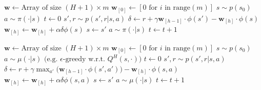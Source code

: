 \begin{appendices}


\begin{algorithm}[H]\small
\caption{\small Linear One-step FHTD for estimating $V^H \approx v^H_\pi$}
\label{alg:onestepfhtd}
\begin{algorithmic}
\State $\textbf{w} \leftarrow \textrm{Array of size } (H + 1) \times m$%
\State $\textbf{w}_{[0]} \leftarrow [0 \textrm{ for } i \textrm{ in } \textrm{range}(m)]$
\State $s \sim p(s_0)$
\State $a \sim \pi(\cdot|s)$
\State $t \leftarrow 0$
    \State $s', r \sim p(s', r|s, a)$
        \State $\delta \leftarrow r + \gamma \textbf{w}_{[h - 1]} \cdot \phi(s') - \textbf{w}_{[h]} \cdot \phi(s)$
        \State $\textbf{w}_{[h]} \leftarrow \textbf{w}_{[h]} + \alpha \delta \phi(s)$
    \EndFor
    \State $s \leftarrow s'$
    \State $a \sim \pi(\cdot|s)$
    \State $t \leftarrow t + 1$
\EndWhile
\end{algorithmic}
\end{algorithm}
\vspace{-\baselineskip}


\begin{algorithm}[H]\small
\caption{\small Linear One-step FHQ-Learning for estimating $Q^H \approx q^H_*$}
\label{alg:onestepfhqlearning}
\begin{algorithmic}
\State $\textbf{w} \leftarrow \textrm{Array of size } (H + 1) \times m$%
\State $\textbf{w}_{[0]} \leftarrow [0 \textrm{ for } i \textrm{ in } \textrm{range}(m)]$
\State $s \sim p(s_0)$
\State $a \sim \mu(\cdot|s) \textrm{ (e.g. }\epsilon\textrm{-greedy w.r.t. }Q^H(s, \cdot))$
\State $t \leftarrow 0$
    \State $s', r \sim p(s', r|s, a)$
        \State $\delta \leftarrow r + \gamma \max_{a'}{\big(\textbf{w}_{[h - 1]} \cdot \phi(s', a')\big)} - \textbf{w}_{[h]} \cdot \phi(s, a)$
        \State $\textbf{w}_{[h]} \leftarrow \textbf{w}_{[h]} + \alpha \delta \phi(s, a)$
    \EndFor
    \State $s \leftarrow s'$
    \State $a \sim \mu(\cdot|s)$
    \State $t \leftarrow t + 1$
\EndWhile
\end{algorithmic}
\end{algorithm}
\vspace{-\baselineskip}


\end{appendices}

